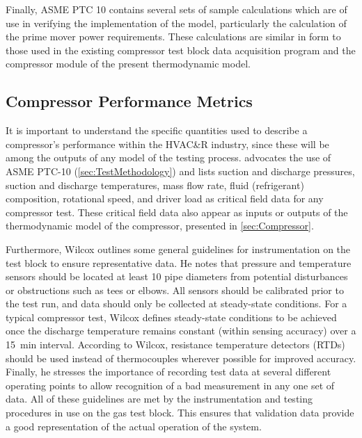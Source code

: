 Finally, ASME PTC 10 contains several sets of sample calculations 
which are of use in verifying the implementation of the model, 
particularly the calculation of the prime mover power requirements.
These calculations are similar in form to those used in the existing
compressor test block data acquisition program and the compressor
module of the present thermodynamic model.

\subsection{Compressor Performance Metrics}
It is important to understand the specific quantities used 
to describe a compressor's performance within the HVAC\&R%
industry, since these will be among the outputs of any model of the testing process. 
\citet{wilcox2007} advocates the use of ASME PTC-10 (\cref{sec:TestMethodology}) and lists
  suction and discharge pressures,
  suction and discharge temperatures,
  mass flow rate,
  fluid (refrigerant) composition,
  rotational speed, and
  driver load
as critical field data for any compressor test.
These critical field data also appear as inputs or outputs 
of the thermodynamic model of the compressor, presented in \cref{sec:Compressor}.

Furthermore, Wilcox outlines some general guidelines 
for instrumentation on the test block to ensure representative data.  
He notes that pressure and temperature sensors should be located 
at least 10 pipe diameters from potential disturbances or obstructions such as tees or elbows.  
All sensors should be calibrated prior to the test run, 
and data should only be collected at steady-state conditions.  
For a typical compressor test, Wilcox defines steady-state conditions to be achieved 
once the discharge temperature remains constant (within sensing accuracy) over a \SI{15}{\minute} interval. 
According to Wilcox, resistance temperature detectors (RTDs)%
should be used instead of thermocouples wherever possible for improved accuracy. 
Finally, he stresses the importance of recording test data at several different operating points 
to allow recognition of a bad measurement in any one set of data.
All of these guidelines are met by the instrumentation and testing procedures
in use on the  gas test block.
This ensures that validation data provide a good representation
of the actual operation of the system.

